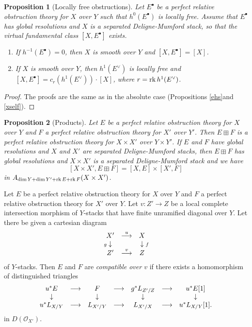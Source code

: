 \documentclass[11pt]{article}
\theoremstyle{plain}
\newtheorem{prop}{Proposition}[section]
\theoremstyle{definition}
\newenvironment{pf}{\begin{proof}}{\end{proof}}
\newcommand{\dual}[1]{{{#1}^{\vee}}}
\newcommand{\upst}{^{\ast}}
\newcommand{\com}{^{\scriptscriptstyle\bullet}}
\renewcommand{\O}{{\mathcal{O}}}
\newcommand{\rk}{\mathop{\rm rk}}
\newcommand{\ldiag}[1]
       {\makebox[0cm]{\({\scriptstyle#1}\downarrow\phantom{\scriptstyle#1}\)}}
\newcommand{\rdiag}[1]
       {\makebox[0cm]{\(\phantom{\scriptstyle#1}\downarrow{\scriptstyle#1}\)}}
\newcommand{\comdia}[9]{
\begin{array}{ccc}
#1 & \stackrel{#2}{\longrightarrow} & #3 \\
\ldiag{#4} & #5 & \rdiag{#6} \\
#7 & \stackrel{#8}{\longrightarrow} & #9
\end{array}}
\theoremstyle{plain}
\theoremstyle{definition}
\theoremstyle{remark}
\begin{document}
\begin{prop}[Locally free obstructions] \label{rulfc}
Let \(E\com\) be a perfect relative obstruction theory for \(X\) over \(Y\)
such that \(h^{0}(E\com)\) is locally free. Assume that \(E\com\) has
global resolutions and \(X\) is a separated Deligne-Mumford stack, so
that the virtual fundamental class \([X,E\com]\) exists.
\begin{enumerate}
\item If \(h^{-1}(E\com)=0\), then \(X\) is smooth over \(Y\) and
\([X,E\com]=[X]\).
\item If \(X\) is smooth over \(Y\), then \(h^1(\dual{E})\) is locally free and
\([X,E\com]=c_r(h^1(\dual{E}))\cdot[X]\), where \(r=\rk h^1(\dual{E})\).
\end{enumerate}
\end{prop}
\begin{pf} The proofs are the same as in the absolute case (Propositions
\ref{ehs}and \ref{xself}).
\end{pf}
\begin{prop}[Products] \label{rvopf}
Let \(E\) be a perfect relative obstruction theory for \(X\) over \(Y\) and
\(F\) a perfect relative obstruction theory for \(X'\) over \(Y'\). Then
\(E\boxplus F\) is a perfect relative obstruction theory for \(X\times
X'\) over \(Y\times Y'\). If \(E\) and \(F\) have global resolutions and \(X\)
and \(X'\) are separated Deligne-Mumford stacks, then \(E\boxplus F\) has
global resolutions and \(X\times X'\) is a separated Deligne-Mumford
stack and we have
\[
[X\times X',E\boxplus F]=[X,E]\times[X',F]
\]
in \(A_{\dim Y+\dim Y'+\rk E+\rk F}(X\times X')\).
\end{prop}

Let \(E\) be a perfect relative obstruction theory for \(X\) over \(Y\) and
\(F\) a perfect relative obstruction theory for \(X'\) over \(Y\). Let
\(v:Z'\rightarrow Z\) be a local complete intersection morphism of
\(Y\)-stacks that have finite unramified diagonal over \(Y\). Let there be
given a cartesian diagram
\[
\comdia{X'}{u}{X}{g}{}{f}{Z'}{v}{Z}
\]
of \(Y\)-stacks. Then \(E\) and \(F\) are {\em compatible over \(v\)} if there
exists a homomorphism of distinguished triangles
\[
\begin{array}{ccccccc}
u\upst E & {\longrightarrow} & F &
{\longrightarrow} & g\upst L_{Z'/Z} &
{\longrightarrow} & u\upst E[1] \\
\ldiag{} & &  \ldiag{} & & \ldiag{} & & \rdiag{} \\
u\upst L_{X/Y} & {\longrightarrow} & L_{X'/Y} &
{\longrightarrow} & L_{X'/X} &
{\longrightarrow} & u\upst L_{X/Y}[1] .
\end{array}
\]
in \(D(\O_{X'})\).
\end{document}
